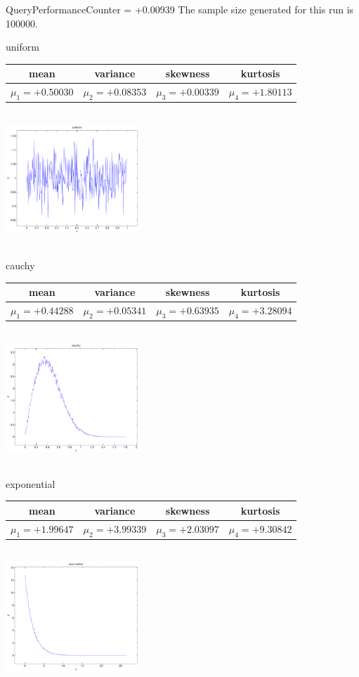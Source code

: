 \documentclass[9pt]{article}
\theoremstyle{plain}
\theoremstyle{definition}
\theoremstyle{remark}
\numberwithin{equation}{section}
\begin{document}
QueryPerformanceCounter  =  +0.00939
The sample size generated for this run is 100000.

\newpage
uniform \begin{tabular}{|c|c|c|c|}  mean & variance & skewness & kurtosis \\  \hline
$\mu_1 = +0.50030$ & $\mu_2 = +0.08353$ & $\mu_3 = +0.00339$ & $\mu_4 =+1.80113$ \\
\end{tabular}

\includegraphics[width=5cm,height=5cm]{uniform.pdf}

cauchy \begin{tabular}{|c|c|c|c|}  mean & variance & skewness & kurtosis \\  \hline
$\mu_1 = +0.44288$ & $\mu_2 = +0.05341$ & $\mu_3 = +0.63935$ & $\mu_4 =+3.28094$ \\
\end{tabular}

\includegraphics[width=5cm,height=5cm]{cauchy.pdf}

exponential \begin{tabular}{|c|c|c|c|}  mean & variance & skewness & kurtosis \\  \hline
$\mu_1 = +1.99647$ & $\mu_2 = +3.99339$ & $\mu_3 = +2.03097$ & $\mu_4 =+9.30842$ \\
\end{tabular}

\includegraphics[width=5cm,height=5cm]{exponential.pdf}
\end{document}
